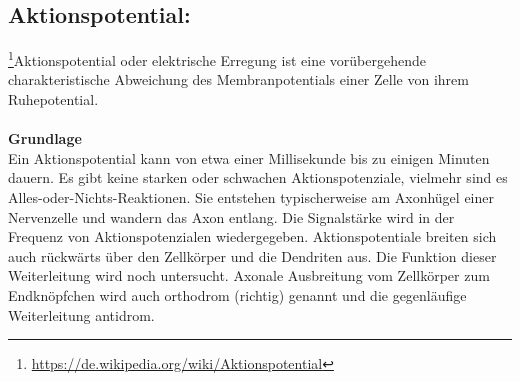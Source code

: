 \subsection{Aktionspotential:}\footnote{\url{https://de.wikipedia.org/wiki/Aktionspotential}}Aktionspotential oder elektrische Erregung ist eine vorübergehende charakteristische Abweichung des Membranpotentials einer Zelle von ihrem Ruhepotential.
\\\\
\textbf{Grundlage}\\
Ein Aktionspotential kann von etwa einer Millisekunde bis zu einigen Minuten dauern. Es gibt keine starken oder schwachen Aktionspotenziale, vielmehr sind es Alles-oder-Nichts-Reaktionen. Sie entstehen typischerweise am Axonhügel einer Nervenzelle und wandern das Axon entlang. Die Signalstärke wird in der Frequenz von Aktionspotenzialen wiedergegeben. Aktionspotentiale breiten sich auch rückwärts über den Zellkörper und die Dendriten aus. Die Funktion dieser Weiterleitung wird noch untersucht. Axonale Ausbreitung vom Zellkörper zum Endknöpfchen wird auch orthodrom (richtig) genannt und die gegenläufige Weiterleitung antidrom.

